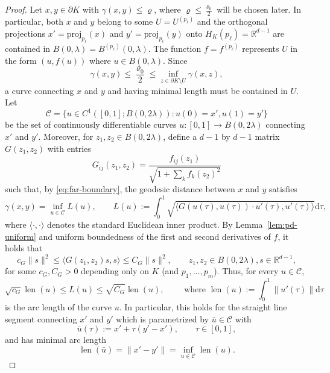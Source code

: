 \documentclass[a4paper,12pt,reqno]{amsart}
\theoremstyle{definition}
\newcommand{\IR}{\mathbb{R}}
\newcommand{\proj}{\mathrm{proj}}
\DeclareMathOperator{\len}{len}
\newcommand{\curv}{\mathcal{C}}
\newcommand{\dd}{\mathrm{d}}
\begin{document}
\begin{proof}
	Let $x,y\in \partial  K$ with $\gamma(x,y)\le \varrho$, where $\varrho\le \frac{\varrho_0}{2}$ will be chosen later. In particular, both $x$ and $y$ belong to some $U=U^{(p_\ell)}$ and the orthogonal projections $x'=\proj_{p_{\ell}}(x)$ and $y'=\proj_{p_{\ell}}(y)$ onto $H_K(p_{\ell})=\IR^{d-1}$ are contained in $B(0,\lambda)=B^{(p_{\ell})}(0,\lambda)$. The function $f=f^{(p_{\ell})}$ represents $U$ in the form $(u,f(u))$ where $u\in B(0,\lambda)$.  Since 
\begin{equation} \label{eq:far-boundary}
	\gamma(x,y)\le \frac{\varrho_0}{2} \le \inf_{z\in \partial K\setminus U}\gamma(x,z),
\end{equation}
a curve connecting $x$ and $y$ and having minimal length must be contained in $U$. Let 
\[
\curv=\{u\in C^1([0,1];B(0,2\lambda))\colon u(0)=x',u(1)=y'\}
\]
be the set of continuously differentiable curves $u\colon [0,1]\to B(0,2\lambda)$ connecting $x'$ and $y'$. Moreover, for $z_1,z_2\in B(0,2\lambda)$, define a $d-1$ by $d-1$ matrix $G(z_1,z_2)$ with entries
\[
G_{ij}(z_1,z_2)
=\frac{f_{ij}(z_1)}{\sqrt{1+\sum_{k}f_k(z_2)^2}} 
\]
such that, by \eqref{eq:far-boundary}, the geodesic distance between $x$ and $y$ satisfies 
\begin{equation} \label{eq:geo}
\gamma(x,y)
=\inf_{u\in  \curv}L(u),
\qquad \text{} L(u):=\int_0^1 \sqrt{\langle G(u(\tau),u(\tau))\cdot u'(\tau),u'(\tau)\rangle} \dd \tau,
\end{equation}
where $\langle \cdot,\cdot\rangle$ denotes the standard Euclidean inner product.  By Lemma~\ref{lem:pd-uniform} and uniform boundedness of the first and second derivatives of $f$, it holds that  
\begin{equation} \label{eq:G-bounds}
c_G\|s\|^2\le \langle G(z_1,z_2)s,s\rangle \le C_G\|s\|^2,\qquad z_1,z_2\in B(0,2\lambda), s\in \IR^{d-1},
\end{equation}
for some $c_G,C_G>0$ depending only on $K$ (and $p_1,\dots,p_m$). Thus, for every $u\in \curv$,  
\[
\sqrt{c_G}\len(u) \le 
L(u)\le \sqrt{C_G}\len(u),\qquad \text{ where }
\len(u)
:= \int_0^1 \|u'(\tau)\|\dd \tau
\]
is the arc length of the curve $u$. In particular, this holds for the straight line segment connecting $x'$ and $y'$ which is parametrized by $\bar{u}\in \curv$ with
\begin{equation} \label{eq:bar-u}
\bar{u}(\tau):=x'+\tau(y'-x'),\qquad \tau\in [0,1],
\end{equation}
and has minimal arc length 
\begin{equation*} 
\len(\bar{u})
=\|x'-y'\|
=\inf_{u\in \curv}\len(u).
\end{equation*}


\end{proof}
\end{document}
